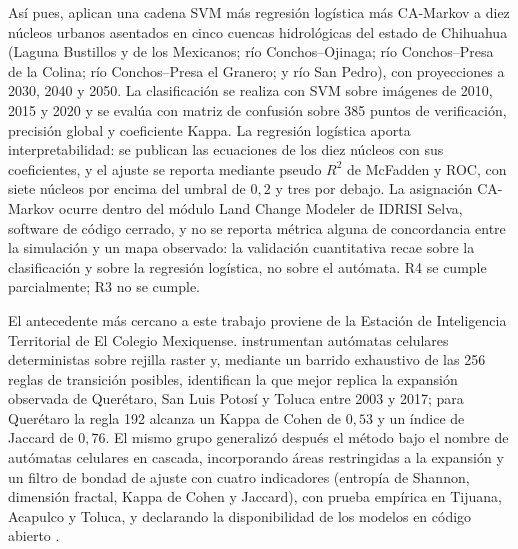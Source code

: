 Así pues, \textcite{Chihuahua2023} aplican una cadena SVM más regresión
logística más CA-Markov a diez núcleos urbanos asentados en cinco cuencas
hidrológicas del estado de Chihuahua (Laguna Bustillos y de los Mexicanos;
río Conchos--Ojinaga; río Conchos--Presa de la Colina; río Conchos--Presa el
Granero; y río San Pedro), con proyecciones a 2030, 2040 y 2050. La
clasificación se realiza con SVM sobre imágenes de 2010, 2015 y 2020 y se
evalúa con matriz de confusión sobre 385 puntos de verificación, precisión
global y coeficiente Kappa. La regresión logística aporta interpretabilidad:
se publican las ecuaciones de los diez núcleos con sus coeficientes, y el
ajuste se reporta mediante pseudo $R^2$ de McFadden y ROC, con siete núcleos
por encima del umbral de $0{,}2$ y tres por debajo. La asignación CA-Markov
ocurre dentro del módulo Land Change Modeler de IDRISI Selva, software de
código cerrado, y no se reporta métrica alguna de concordancia entre la
simulación y un mapa observado: la validación cuantitativa recae sobre la
clasificación y sobre la regresión logística, no sobre el autómata. R4 se
cumple parcialmente; R3 no se cumple.

El antecedente más cercano a este trabajo proviene de la Estación de
Inteligencia Territorial de El Colegio Mexiquense.
\textcite{JimenezLopez2018} instrumentan autómatas celulares deterministas
sobre rejilla raster y, mediante un barrido exhaustivo de las 256 reglas de
transición posibles, identifican la que mejor replica la expansión observada
de Querétaro, San Luis Potosí y Toluca entre 2003 y 2017; para Querétaro la
regla 192 alcanza un Kappa de Cohen de $0{,}53$ y un índice de Jaccard de
$0{,}76$. El mismo grupo generalizó después el método bajo el nombre de
autómatas celulares en cascada, incorporando áreas restringidas a la expansión
y un filtro de bondad de ajuste con cuatro indicadores (entropía de Shannon,
dimensión fractal, Kappa de Cohen y Jaccard), con prueba empírica en Tijuana,
Acapulco y Toluca, y declarando la disponibilidad de los modelos en código
abierto \parencite{JimenezLopez2021}.

